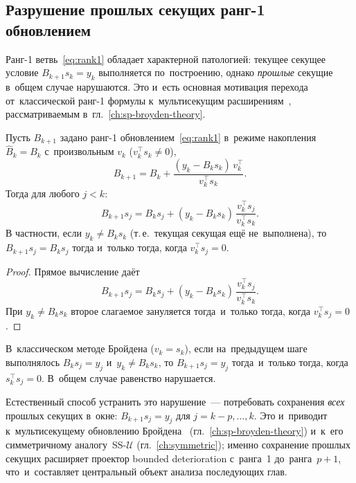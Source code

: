 \subsection*{Разрушение прошлых секущих ранг-1 обновлением}\label{sec:rank1_destruction}

Ранг-1 ветвь~\eqref{eq:rank1} обладает характерной патологией:
текущее секущее условие $B_{k+1}s_k = y_k$ выполняется по~построению, однако
\emph{прошлые} секущие в~общем случае нарушаются. Это и~есть основная
мотивация перехода от~классической ранг-1 формулы к~мультисекущим
расширениям~\cite{schnabel1983,gay_schnabel1978}, рассматриваемым
в~гл.~\ref{ch:sp-broyden-theory}.

\begin{proposition}\label{prop:destruction}
Пусть $B_{k+1}$ задано ранг-1 обновлением~\eqref{eq:rank1} в~режиме
накопления $\widehat{B}_k = B_k$ с~произвольным $v_k$ ($v_k^\top s_k \neq 0$),
\[
  B_{k+1} = B_k + \frac{(y_k - B_k s_k)\,v_k^\top}{v_k^\top s_k}.
\]
Тогда для любого $j < k$:
\[
  B_{k+1} s_j = B_k s_j + (y_k - B_k s_k)\,\frac{v_k^\top s_j}{v_k^\top s_k}.
\]
В частности, если $y_k \neq B_k s_k$ (т.\,е.\ текущая секущая ещё не~выполнена),
то $B_{k+1} s_j = B_k s_j$ тогда и~только тогда, когда $v_k^\top s_j = 0$.
\end{proposition}

\begin{proof}
Прямое вычисление даёт
\[
  B_{k+1} s_j
  = B_k s_j + (y_k - B_k s_k)\,\frac{v_k^\top s_j}{v_k^\top s_k}.
\]
При $y_k \neq B_k s_k$ второе слагаемое зануляется тогда~и~только тогда,
когда $v_k^\top s_j = 0$.
\end{proof}

\begin{corollary}\label{cor:broyden_destruction}
В~классическом методе Бройдена ($v_k = s_k$), если на~предыдущем шаге
выполнялось $B_k s_j = y_j$ и~$y_k \neq B_k s_k$, то $B_{k+1} s_j = y_j$
тогда~и~только тогда, когда $s_k^\top s_j = 0$. В~общем случае равенство нарушается.
\end{corollary}

Естественный способ устранить это нарушение~--- потребовать сохранения
\emph{всех} прошлых секущих в~окне: $B_{k+1} s_j = y_j$ для
$j=k{-}p,\ldots,k$. Это и~приводит к~мультисекущему обновлению
Бройдена~\cite{schnabel1983} (гл.~\ref{ch:sp-broyden-theory}) и~к~его
симметричному аналогу~SS-$\mathcal{U}$ (гл.~\ref{ch:symmetric}); именно
сохранение прошлых секущих расширяет проектор bounded deterioration
с~ранга~1 до~ранга~$p{+}1$, что~и~составляет центральный объект
анализа последующих глав.

